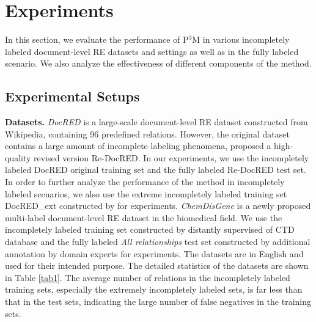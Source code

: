 \documentclass[11pt]{article}
\begin{document}

\section{Experiments}
In this section, we evaluate the performance of P$^{3}$M in various incompletely labeled document-level RE datasets and settings as well as in the fully labeled scenario. We also analyze the effectiveness of different components of the method.

\subsection{Experimental Setups}

\textbf{Datasets.} \enspace \emph{DocRED} \citep{yao-etal-2019-docred} is a large-scale document-level RE dataset constructed from Wikipedia, containing 96 predefined relations. However, the original dataset contains a large amount of incomplete labeling phenomena, \citep{tan-etal-2022-revisiting} proposed a high-quality revised version Re-DocRED. In our experiments, we use the incompletely labeled DocRED original training set and the fully labeled Re-DocRED test set. In order to further analyze the performance of the method in incompletely labeled scenarios, we also use the extreme incompletely labeled training set DocRED\_ext constructed by \citep{wang2022unified} for experiments. \enspace \emph{ChemDisGene} \citep{zhang-etal-2022-distant} is a newly proposed multi-label document-level RE dataset in the biomedical field. We use the incompletely labeled training set constructed by distantly supervised of CTD database \citep{davis2021comparative} and the fully labeled \emph{All relationships} test set constructed by additional annotation by domain experts for experiments. \enspace The datasets are in English and used for their intended purpose. The detailed statistics of the datasets are shown in Table \ref{tab1}. The average number of relations in the incompletely labeled training sets, especially the extremely incompletely labeled sets, is far less than that in the test sets, indicating the large number of false negatives in the training sets.
\end{document}
